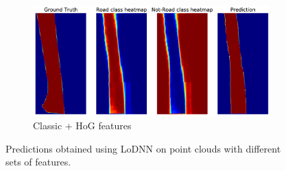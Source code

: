 \documentclass[10pt,twocolumn,letterpaper]{article}
\begin{document}
\begin{figure}[!th]
  \begin{subfigure}[b]{\columnwidth}
    \includegraphics[width=\columnwidth]{pred_classic_hog.png}
    \caption{Classic + HoG features}
  \end{subfigure}
 \caption{Predictions obtained using LoDNN on point clouds with different sets of features.}
 \label{fig:results}
 \end{figure}
\end{document}
